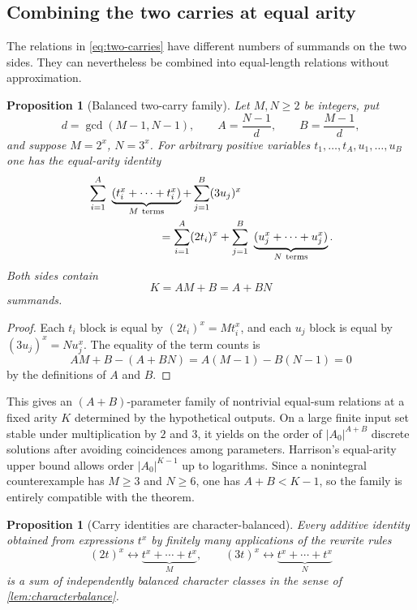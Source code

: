 \documentclass[11pt,oneside]{article}
\newtheorem{proposition}[theorem]{Proposition}
\theoremstyle{definition}
\begin{document}
\subsection{Combining the two carries at equal arity}

The relations in \eqref{eq:two-carries} have different numbers of summands on the two sides.  They can nevertheless be combined into equal-length relations without approximation.

\begin{proposition}[Balanced two-carry family]\label{prop:balancedcarry}
Let $M,N\ge2$ be integers, put
\[
      d=\gcd(M-1,N-1),\qquad
      A=\frac{N-1}{d},\qquad
      B=\frac{M-1}{d},
\]
and suppose $M=2^x$, $N=3^x$.  For arbitrary positive variables
$t_1,\ldots,t_A,u_1,\ldots,u_B$ one has the equal-arity identity
\begin{align}
 &\sum_{i=1}^{A}\ \underbrace{(t_i^x+\cdots+t_i^x)}_{M\ \mathrm{terms}}
   +\sum_{j=1}^{B}(3u_j)^x \notag\\
 &\hspace{2.2cm}=
   \sum_{i=1}^{A}(2t_i)^x
   +\sum_{j=1}^{B}\ \underbrace{(u_j^x+\cdots+u_j^x)}_{N\ \mathrm{terms}}.
 \label{eq:balancedcarry}
\end{align}
Both sides contain
\[
       K=AM+B=A+BN
\]
summands.
\end{proposition}

\begin{proof}
Each $t_i$ block is equal by $(2t_i)^x=M t_i^x$, and each $u_j$ block is equal by $(3u_j)^x=N u_j^x$.  The equality of the term counts is
\[
       AM+B-(A+BN)=A(M-1)-B(N-1)=0
\]
by the definitions of $A$ and $B$.
\end{proof}

This gives an $(A+B)$-parameter family of nontrivial equal-sum relations at a fixed arity $K$ determined by the hypothetical outputs.  On a large finite input set stable under multiplication by $2$ and $3$, it yields on the order of $|A_0|^{A+B}$ discrete solutions after avoiding coincidences among parameters.  Harrison's equal-arity upper bound allows order $|A_0|^{K-1}$ up to logarithms.  Since a nonintegral counterexample has $M\ge3$ and $N\ge6$, one has $A+B<K-1$, so the family is entirely compatible with the theorem.

\begin{proposition}[Carry identities are character-balanced]\label{prop:carrybalanced}
Every additive identity obtained from expressions $t^x$ by finitely many applications of the rewrite rules
\[
       (2t)^x\longleftrightarrow
       \underbrace{t^x+\cdots+t^x}_{M},
       \qquad
       (3t)^x\longleftrightarrow
       \underbrace{t^x+\cdots+t^x}_{N}
\]
is a sum of independently balanced character classes in the sense of
\cref{lem:characterbalance}.
\end{proposition}
\end{document}
